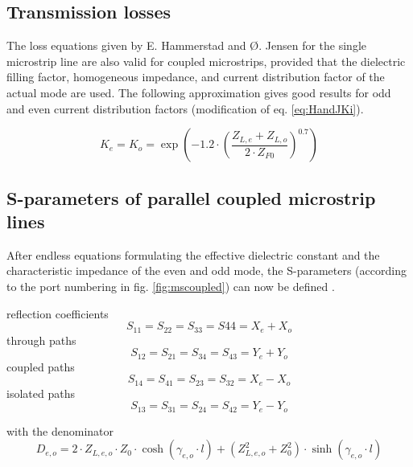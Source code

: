 \documentclass[10pt]{report}
\begin{document}
\subsection{Transmission losses}

The loss equations given by E. Hammerstad and {\O}. Jensen
\cite{Hammerstad} for the single microstrip line are also valid for
coupled microstrips, provided that the dielectric filling factor,
homogeneous impedance, and current distribution factor of the actual
mode are used.  The following approximation gives good results for odd
and even current distribution factors (modification of
eq. \eqref{eq:HandJKi}).

\begin{equation}
K_e = K_o = \exp{\left(-1.2\cdot\left(\dfrac{Z_{L,e} + Z_{L,o}}{2\cdot Z_{F0}}\right)^{0.7}\right)}
\end{equation}

\subsection{S-parameters of parallel coupled microstrip lines}

After endless equations formulating the effective dielectric constant
and the characte\-ris\-tic impe\-dance of the even and odd mode, the
S-parameters (according to the port numbering in
fig. \ref{fig:mscoupled}) can now be defined \cite{Edwards}.

\addvspace{12pt}

reflection coefficients
\begin{equation}
S_{11} = S_{22} = S_{33} = S{44} = X_e + X_o
\end{equation}
through paths
\begin{equation}
S_{12} = S_{21} = S_{34} = S_{43} = Y_e + Y_o
\end{equation}
coupled paths
\begin{equation}
S_{14} = S_{41} = S_{23} = S_{32} = X_e - X_o
\end{equation}
isolated paths
\begin{equation}
S_{13} = S_{31} = S_{24} = S_{42} = Y_e - Y_o
\end{equation}

with the denominator
\begin{equation}
D_{e,o} = 2\cdot Z_{L,e,o}\cdot Z_0\cdot \cosh(\gamma_{e,o}\cdot l)
         + \left(Z_{L,e,o}^2 + Z_0^2\right)\cdot \sinh\left(\gamma_{e,o}\cdot l\right)
\end{equation}
\end{document}
